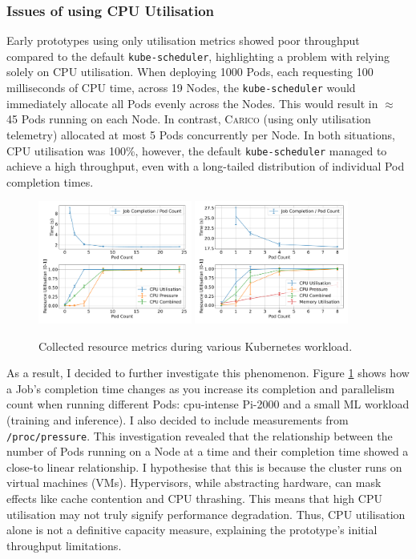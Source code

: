 \subsubsection{Issues of using CPU Utilisation}
\label{sec:issue-with-util}
Early prototypes using only utilisation metrics showed poor throughput compared
to the default \verb|kube-scheduler|, highlighting a problem with relying solely
on CPU utilisation. When deploying 1000 Pods, each requesting 100 milliseconds
of CPU time, across 19 Nodes, the \verb|kube-scheduler| would immediately
allocate all Pods evenly across the Nodes. This would result in $\approx$ 45
Pods running on each Node. In contrast, \textsc{Carico} (using only utilisation
telemetry) allocated at most 5 Pods concurrently per Node. In both situations,
CPU utilisation was 100\%, however, the default \verb|kube-scheduler| managed to
achieve a high throughput, even with a long-tailed distribution of individual
Pod completion times.

\begin{figure}[H]
    \centering
    \includegraphics[width=0.45\textwidth]{images/podcount-util-pressure.pdf}
    \includegraphics[width=0.45\textwidth]{images/ml-podcount-util-pressure.pdf}
    \caption{Collected resource metrics during various Kubernetes workload.}
    \label{fig:podcount-util-pressure}
\end{figure}

As a result, I decided to further investigate this phenomenon. Figure
\ref{fig:podcount-util-pressure} shows how a Job's completion time changes as you
increase its completion and parallelism count when running different Pods:
cpu-intense Pi-2000 and a small ML workload (training and inference). I also
decided to include measurements from \verb|/proc/pressure|. This investigation
revealed that the relationship between the number of Pods running on
a Node at a time and their completion time showed a close-to linear
relationship. I hypothesise that this is because the cluster runs on virtual
machines (VMs). Hypervisors, while abstracting hardware, can mask effects like
cache contention and CPU thrashing. This means that high  CPU utilisation may
not truly signify performance degradation. Thus, CPU utilisation alone is not a
definitive capacity measure, explaining the prototype's initial throughput
limitations.

